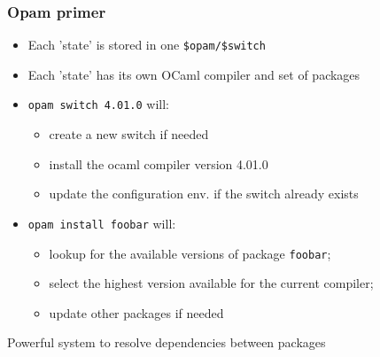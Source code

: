 \documentclass[9pt]{beamer}
\begin{document}
\begin{frame}[fragile]
  \frametitle{Opam primer}
  \begin{itemize}
  \item Each 'state' is stored in one {\verb!$opam/$switch!}
  \item Each 'state' has its own OCaml compiler and set of packages
  \item {\tt opam switch 4.01.0} will:
    \begin{itemize}
    \item create a new switch if needed
    \item install the ocaml compiler version 4.01.0
      \pause
    \item update the configuration env. if the switch already exists
    \end{itemize}
    \pause
  \item {\tt opam install foobar} will:
    \begin{itemize}
    \item lookup for the available versions of package {\tt foobar};
    \item select the highest version available for the current compiler; 
    \item update other packages if needed
    \end{itemize}
  \end{itemize}
  
  \pause
  
  \begin{center}
    Powerful system to resolve dependencies between packages
  \end{center}
\end{frame}
\end{document}
